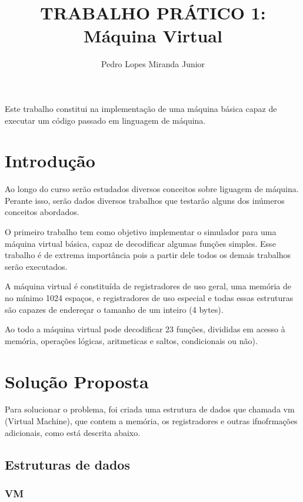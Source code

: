 \documentclass[12pt]{article}
\title{TRABALHO PRÁTICO 1: \\ Máquina Virtual}
\author{Pedro Lopes Miranda Junior}
\begin{document}
\maketitle

\begin{resumo} 
Este trabalho constitui na implementação de uma máquina básica capaz de
executar um código passado em linguagem de máquina.
\end{resumo}

\section{Introdução}
\label{introducao}
Ao longo do curso serão estudados diversos conceitos sobre liguagem de máquina.
Perante isso, serão dados diversos trabalhos que testarão alguns dos inúmeros
conceitos abordados.

O primeiro trabalho tem como objetivo implementar o simulador para uma máquina
virtual básica, capaz de decodificar algumas funções simples. Esse trabalho é
de extrema importância pois a partir dele todos os demais trabalhos serão
executados.

A máquina virtual é constituída de registradores de uso geral, uma memória de
no mínimo 1024 espaços, e registradores de uso especial e todas essas estruturas
são capazes de endereçar o tamanho de um inteiro (4 bytes).

Ao todo a máquina virtual pode decodificar 23 funções, divididas em acesso à
memória, operações lógicas, aritmeticas e saltos, condicionais ou não).

\section{Solução Proposta}
\label{solucao_proposta}
Para solucionar o problema, foi criada uma estrutura de dados que chamada vm
(Virtual Machine), que contem a memória, os registradores e outras ifnofrmações
adicionais, como está descrita abaixo.

\subsection{Estruturas de dados}

\subsubsection{VM}
\end{document}
